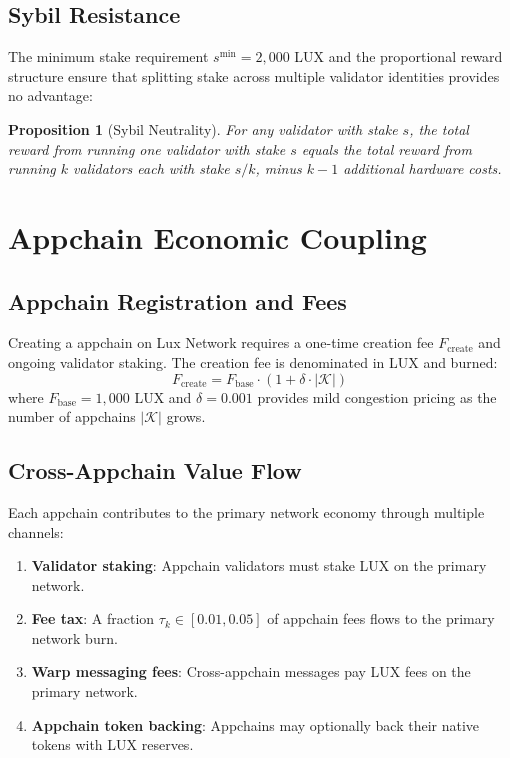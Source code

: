 \documentclass[11pt,a4paper]{article}
\newtheorem{proposition}[theorem]{Proposition}
\begin{document}
\subsection{Sybil Resistance}

The minimum stake requirement $s^{\min} = 2{,}000$ LUX and the proportional reward structure ensure that splitting stake across multiple validator identities provides no advantage:

\begin{proposition}[Sybil Neutrality]
For any validator with stake $s$, the total reward from running one validator with stake $s$ equals the total reward from running $k$ validators each with stake $s/k$, minus $k-1$ additional hardware costs.
\end{proposition}

\section{Appchain Economic Coupling}\label{sec:appchain}

\subsection{Appchain Registration and Fees}

Creating a appchain on Lux Network requires a one-time creation fee $F_{\text{create}}$ and ongoing validator staking. The creation fee is denominated in LUX and burned:
\begin{equation}
    F_{\text{create}} = F_{\text{base}} \cdot (1 + \delta \cdot |\mathcal{K}|)
\end{equation}
where $F_{\text{base}} = 1{,}000$ LUX and $\delta = 0.001$ provides mild congestion pricing as the number of appchains $|\mathcal{K}|$ grows.

\subsection{Cross-Appchain Value Flow}

Each appchain contributes to the primary network economy through multiple channels:

\begin{enumerate}[label=(\arabic*)]
    \item \textbf{Validator staking}: Appchain validators must stake LUX on the primary network.
    \item \textbf{Fee tax}: A fraction $\tau_k \in [0.01, 0.05]$ of appchain fees flows to the primary network burn.
    \item \textbf{Warp messaging fees}: Cross-appchain messages pay LUX fees on the primary network.
    \item \textbf{Appchain token backing}: Appchains may optionally back their native tokens with LUX reserves.
\end{enumerate}
\end{document}
